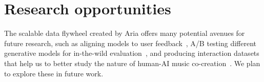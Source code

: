 \documentclass{article}
\begin{document}
\vspace{-3mm}
\section{Research opportunities}

The scalable data flywheel created by Aria offers many potential avenues for future research, 
such as aligning models to user feedback~\cite{ouyang2022training}, 
A/B testing different generative models for in-the-wild evaluation~\cite{chiang2024chatbot}, 
and producing interaction datasets that help us to better study the nature of human-AI music co-creation~\cite{lee2022coauthor}. 
We plan to explore these in future work.




\end{document}
